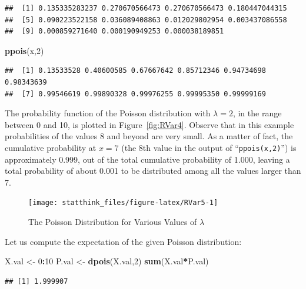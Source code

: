 \documentclass[]{krantz}
\makeatletter
\newenvironment{Shaded}{\begin{snugshade}}{\end{snugshade}}
\newcommand{\DecValTok}[1]{\textcolor[rgb]{0.00,0.00,0.81}{#1}}
\newcommand{\KeywordTok}[1]{\textcolor[rgb]{0.13,0.29,0.53}{\textbf{#1}}}
\newcommand{\NormalTok}[1]{#1}
\newcommand{\OperatorTok}[1]{\textcolor[rgb]{0.81,0.36,0.00}{\textbf{#1}}}
\newcommand{\StringTok}[1]{\textcolor[rgb]{0.31,0.60,0.02}{#1}}
\newenvironment{kframe}{%
\medskip{}
\setlength{\fboxsep}{.8em}
 \def\at@end@of@kframe{}%
 \ifinner\ifhmode%
  \def\at@end@of@kframe{\end{minipage}}%
  \begin{minipage}{\columnwidth}%
 \fi\fi%
 \def\FrameCommand##1{\hskip\@totalleftmargin \hskip-\fboxsep
 \colorbox{shadecolor}{##1}\hskip-\fboxsep
     \hskip-\linewidth \hskip-\@totalleftmargin \hskip\columnwidth}%
 \MakeFramed {\advance\hsize-\width
   \@totalleftmargin\z@ \linewidth\hsize
   \@setminipage}}%
 {\par\unskip\endMakeFramed%
 \at@end@of@kframe}
\renewenvironment{Shaded}{\begin{kframe}}{\end{kframe}}
\theoremstyle{definition}
\theoremstyle{definition}
\theoremstyle{definition}
\theoremstyle{remark}
\makeatother
\begin{document}
\begin{verbatim}
##  [1] 0.135335283237 0.270670566473 0.270670566473 0.180447044315
##  [5] 0.090223522158 0.036089408863 0.012029802954 0.003437086558
##  [9] 0.000859271640 0.000190949253 0.000038189851
\end{verbatim}

\begin{Shaded}
\begin{Highlighting}[]
\KeywordTok{ppois}\NormalTok{(x,}\DecValTok{2}\NormalTok{)}
\end{Highlighting}
\end{Shaded}

\begin{verbatim}
##  [1] 0.13533528 0.40600585 0.67667642 0.85712346 0.94734698 0.98343639
##  [7] 0.99546619 0.99890328 0.99976255 0.99995350 0.99999169
\end{verbatim}

The probability function of the Poisson distribution with \(\lambda = 2\),
in the range between 0 and 10, is plotted in
Figure~\ref{fig:RVar4}. Observe that in this example probabilities
of the values 8 and beyond are very small. As a matter of fact, the
cumulative probability at \(x=7\) (the 8th value in the output of
``\texttt{ppois(x,2)}'') is approximately 0.999, out of the total cumulative
probability of 1.000, leaving a total probability of about 0.001 to be
distributed among all the values larger than 7.

\begin{figure}

{\centering \texttt{[image: statthink\_files/figure-latex/RVar5-1]} 

}

\caption{The Poisson Distribution for Various Values of $\lambda$}\label{fig:RVar5}
\end{figure}

Let us compute the expectation of the given Poisson distribution:

\begin{Shaded}
\begin{Highlighting}[]
\NormalTok{X.val <-}\StringTok{ }\DecValTok{0}\OperatorTok{:}\DecValTok{10}
\NormalTok{P.val <-}\StringTok{ }\KeywordTok{dpois}\NormalTok{(X.val,}\DecValTok{2}\NormalTok{)}
\KeywordTok{sum}\NormalTok{(X.val}\OperatorTok{*}\NormalTok{P.val)}
\end{Highlighting}
\end{Shaded}

\begin{verbatim}
## [1] 1.999907
\end{verbatim}
\end{document}
